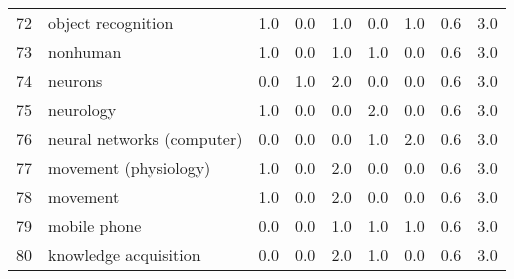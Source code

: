 \begin{tabular}{llrrrrrrr}
72 &                       object recognition &   1.0 &   0.0 &   1.0 &   0.0 &   1.0 &   0.6 &    3.0 \\
73 &                                 nonhuman &   1.0 &   0.0 &   1.0 &   1.0 &   0.0 &   0.6 &    3.0 \\
74 &                                  neurons &   0.0 &   1.0 &   2.0 &   0.0 &   0.0 &   0.6 &    3.0 \\
75 &                                neurology &   1.0 &   0.0 &   0.0 &   2.0 &   0.0 &   0.6 &    3.0 \\
76 &               neural networks (computer) &   0.0 &   0.0 &   0.0 &   1.0 &   2.0 &   0.6 &    3.0 \\
77 &                    movement (physiology) &   1.0 &   0.0 &   2.0 &   0.0 &   0.0 &   0.6 &    3.0 \\
78 &                                 movement &   1.0 &   0.0 &   2.0 &   0.0 &   0.0 &   0.6 &    3.0 \\
79 &                             mobile phone &   0.0 &   0.0 &   1.0 &   1.0 &   1.0 &   0.6 &    3.0 \\
80 &                    knowledge acquisition &   0.0 &   0.0 &   2.0 &   1.0 &   0.0 &   0.6 &    3.0 \\
\bottomrule
\end{tabular}
